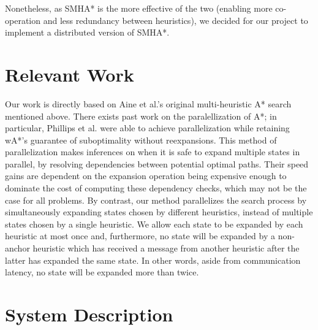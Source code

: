 \documentclass[11pt]{article}
\begin{document}
{Nonetheless, as SMHA* is the more effective of the two (enabling more co-operation and less redundancy between heuristics), we decided for our project to implement a distributed version of SMHA*.

\section{Relevant Work}

Our work is directly based on Aine et al.'s original multi-heuristic A* search \cite{Aine14} mentioned above. There exists past work on the paralellization of A*; in particular, Phillips et al. \cite{phillips2014pa} were able to achieve parallelization while retaining wA*'s guarantee of suboptimality without reexpansions. This method of parallelization makes inferences on when it is safe to expand multiple states in parallel, by resolving dependencies between potential optimal paths. Their speed gains are dependent on the expansion operation being expensive enough to dominate the cost of computing these dependency checks, which may not be the case for all problems. By contrast, our method parallelizes the search process by simultaneously expanding states chosen by different heuristics, instead of multiple states chosen by a single heuristic. We allow each state to be expanded by each heuristic at most once and, furthermore, no state will be expanded by a non-anchor heuristic which has received a message from another heuristic after the latter has expanded the same state. In other words, aside from communication latency, no state will be expanded more than twice.

\section{System Description}

}
\end{document}
